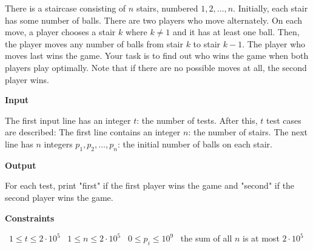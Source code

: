 There is a staircase consisting of $n$ stairs, numbered $1,2,\ldots,n$. Initially, each stair has some number of balls.
There are two players who move alternately. On each move, a player chooses a stair $k$ where $k \neq 1$ and it has at least one ball. Then, the player moves any number of balls from stair $k$ to stair $k-1$. The player who moves last wins the game.
Your task is to find out who wins the game when both players play optimally.
Note that if there are no possible moves at all, the second player wins.

\vspace{0.3cm}\noindent\textbf{Input}

The first input line has an integer $t$: the number of tests. After this, $t$ test cases are described:
The first line contains an integer $n$: the number of stairs.
The next line has $n$ integers $p_1,p_2,\ldots,p_n$: the initial number of balls on each stair.

\vspace{0.3cm}\noindent\textbf{Output}

For each test, print "first" if the first player wins the game and "second" if the second player wins the game.

\vspace{0.3cm}\noindent\textbf{Constraints}

\textbullet\ $1 \le t \le 2 \cdot 10^5$
\textbullet\ $1 \le n \le 2 \cdot 10^5$
\textbullet\ $0 \le p_i \le 10^9$
\textbullet\ the sum of all $n$ is at most $2 \cdot 10^5$
